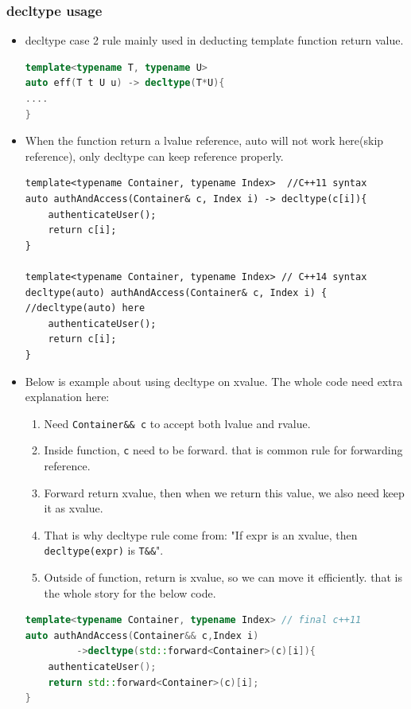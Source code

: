 \documentclass[a4paper,11pt,twoside]{book}
\begin{document}
\subsubsection{decltype usage}
\begin{itemize}
	\item decltype case 2 rule mainly used in deducting template function return value.
\begin{lstlisting}[frame=single, language=c++, mathescape=true]
template<typename T, typename U>
auto eff(T t U u) -> decltype(T*U){
....
}
\end{lstlisting}

	\item When the function return a lvalue reference, auto will not work here(skip reference), only decltype can keep reference properly.
\begin{lstlisting}
template<typename Container, typename Index>  //C++11 syntax
auto authAndAccess(Container& c, Index i) -> decltype(c[i]){
	authenticateUser();
	return c[i];
}

template<typename Container, typename Index> // C++14 syntax
decltype(auto) authAndAccess(Container& c, Index i) {  //decltype(auto) here
	authenticateUser();                               
	return c[i];
}
\end{lstlisting}
	
	\item Below is example about using decltype on xvalue. The whole code need extra explanation here:
	\begin{enumerate}
		\item Need \texttt{Container\&\& c} to accept both lvalue and rvalue.
		\item Inside function, \texttt{c} need to be forward. that is common rule for forwarding reference.
		\item Forward return xvalue, then when we return this value, we also need keep it as xvalue.
		\item That is why decltype rule come from: "If expr is an xvalue, then \texttt{decltype(expr)} is \texttt{T\&\&}".
		\item Outside of function, return is xvalue, so we can move it efficiently. that is the whole story for the below code. 
	\end{enumerate}
\begin{lstlisting}[frame=single, language=c++, mathescape=true]
template<typename Container, typename Index> // final c++11
auto authAndAccess(Container&& c,Index i)
         ->decltype(std::forward<Container>(c)[i]){
	authenticateUser();
	return std::forward<Container>(c)[i];
}


\end{lstlisting}
\end{itemize}
\end{document}
